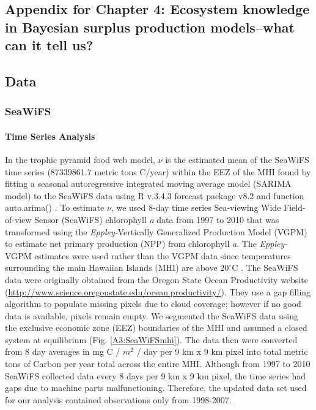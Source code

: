 \documentclass[oneside,12pt,final]{sty/ucthesis-CA2012}
\let\cite\citep                             %
\begin{document}
\begin{mainmatter}
\chapter{Appendix for Chapter 4: Ecosystem knowledge in Bayesian surplus production models--what can it tell us?}{\label{appendix:c}}


\section{Data}
\subsection{SeaWiFS}
\subsubsection{Time Series Analysis}
In the trophic pyramid food web model, $\nu$ is the estimated mean of the SeaWiFS time series (87339861.7 metric tons C/year) within the EEZ of the MHI found by fitting a seasonal autoregressive integrated moving average model (SARIMA model) to the SeaWiFS data using R v.3.4.3 \cite{Rcite} forecast package v8.2 and function auto.arima() \cite{forecast1, forecast2}. To estimate $\nu$, we used 8-day time series Sea-viewing Wide Field-of-view Sensor (SeaWiFS) chlorophyll \textit{a} data from 1997 to 2010 that was transformed using the \textit{Eppley-}Vertically Generalized Production Model (VGPM) to estimate net primary production (NPP) from chlorophyll \textit{a}. The \textit{Eppley-}VGPM estimates were used rather than the VGPM data since temperatures surrounding the main Hawaiian Islands (MHI) are above $20^{\circ}$C \cite{morel1991pigment, antoine1996oceanic, stock2017reconciling}. The SeaWiFS data were originally obtained from the Oregon State Ocean Productivity website (\url{http://www.science.oregonstate.edu/ocean.productivity/}). They use a gap filling algorithm to populate missing pixels due to cloud coverage; however if no good data is available, pixels remain empty. We segmented the SeaWiFS data using the exclusive economic zone (EEZ) boundaries of the MHI and assumed a closed system at equilibrium (Fig. \ref{A3:SeaWiFSmhi}). The data then were converted from 8 day averages in mg C / $m^2$ / day per 9 km x 9 km pixel into total metric tons of Carbon per year total across the entire MHI. Although from 1997 to 2010 SeaWiFS collected data every 8 days  per 9 km x 9 km pixel, the time series had gaps due to machine parts malfunctioning. Therefore, the updated data set used for our analysis contained observations only from 1998-2007. 


\end{mainmatter}
\end{document}
